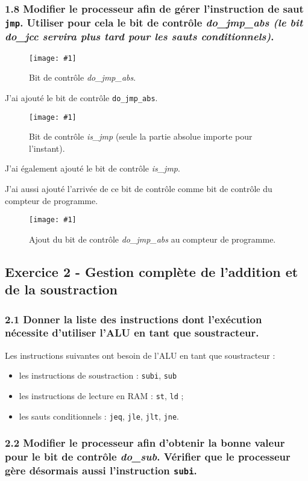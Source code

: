\documentclass[twoside, 12pt, a4paper]{article}
\newcommand{\cf}[3]{
    \begin{figure}[!hbt]
        \centering
        \texttt{[image: \#1]}
    \caption{#3}\label{Fig:#1}
    \end{figure}
}
\newcommand{\hcf}[2]{\cf{#1}{.75}{#2}}
\begin{document}
        \subsubsection*{\textbf{1.8} Modifier le processeur afin de gérer l'instruction de saut \texttt{jmp}. Utiliser pour cela le bit de contrôle \textit{do\_jmp\_abs (le bit \textit{do\_jcc} servira plus tard pour les sauts conditionnels)}.}

        \hcf{do_jmp_abs.png}{Bit de contrôle \textit{do\_jmp\_abs}.}
        J'ai ajouté le bit de contrôle \texttt{do\_jmp\_abs}.

        \hcf{is_jmp.png}{Bit de contrôle \textit{is\_jmp} (seule la partie absolue importe pour l'instant).}
        J'ai également ajouté le bit de contrôle \textit{is\_jmp}.
        
        J'ai aussi ajouté l'arrivée de ce bit de contrôle comme bit de contrôle du compteur de programme.

        \hcf{clock_abs.png}{Ajout du bit de contrôle \textit{do\_jmp\_abs} au compteur de programme.}

\newpage

        \subsection{Exercice 2 - Gestion complète de l'addition et de la soustraction}

        \subsubsection*{\textbf{2.1} Donner la liste des instructions dont l'exécution nécessite d'utiliser l'ALU en tant que soustracteur.}

    Les instructions suivantes ont besoin de l'ALU en tant que soustracteur :
    \begin{itemize}[nosep]
        \item les instructions de soustraction : \texttt{subi}, \texttt{sub}
        \item les instructions de lecture en RAM : \texttt{st}, \texttt{ld} ;
        \item les sauts conditionnels : \texttt{jeq}, \texttt{jle}, \texttt{jlt}, \texttt{jne}.
    \end{itemize}\vspace*{-\baselineskip}

        \subsubsection*{\textbf{2.2} Modifier le processeur afin d'obtenir la bonne valeur pour le bit de contrôle \textit{do\_sub}. Vérifier que le processeur gère désormais aussi l'instruction \texttt{subi}.}
\end{document}
